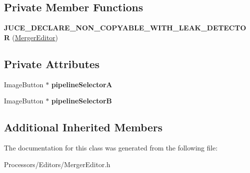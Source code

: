 \subsection*{Private Member Functions}
\begin{DoxyCompactItemize}
\item 
\hypertarget{classMergerEditor_a20e1c357734a7b7e2851a4838e302e4f}{{\bfseries J\-U\-C\-E\-\_\-\-D\-E\-C\-L\-A\-R\-E\-\_\-\-N\-O\-N\-\_\-\-C\-O\-P\-Y\-A\-B\-L\-E\-\_\-\-W\-I\-T\-H\-\_\-\-L\-E\-A\-K\-\_\-\-D\-E\-T\-E\-C\-T\-O\-R} (\hyperlink{classMergerEditor}{Merger\-Editor})}\label{classMergerEditor_a20e1c357734a7b7e2851a4838e302e4f}

\end{DoxyCompactItemize}
\subsection*{Private Attributes}
\begin{DoxyCompactItemize}
\item 
\hypertarget{classMergerEditor_a5328249601266052a95c2ec88315e151}{Image\-Button $\ast$ {\bfseries pipeline\-Selector\-A}}\label{classMergerEditor_a5328249601266052a95c2ec88315e151}

\item 
\hypertarget{classMergerEditor_aa37ca3add0678985d9b338c421646814}{Image\-Button $\ast$ {\bfseries pipeline\-Selector\-B}}\label{classMergerEditor_aa37ca3add0678985d9b338c421646814}

\end{DoxyCompactItemize}
\subsection*{Additional Inherited Members}


The documentation for this class was generated from the following file\-:\begin{DoxyCompactItemize}
\item 
Processors/\-Editors/Merger\-Editor.\-h\end{DoxyCompactItemize}
